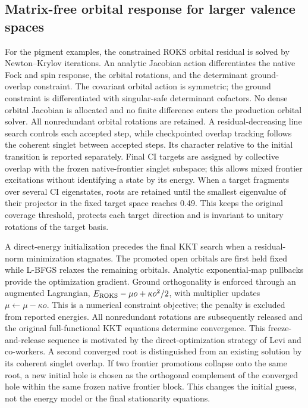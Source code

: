 \subsection{Matrix-free orbital response for larger valence spaces}
For the pigment examples, the constrained ROKS orbital residual is solved
by Newton--Krylov iterations. An analytic Jacobian action differentiates the
native Fock and spin response, the orbital rotations, and the determinant
ground-overlap constraint. The covariant orbital action is symmetric; the
ground constraint is differentiated with singular-safe determinant
cofactors. No dense orbital Jacobian is allocated and no finite difference
enters the production orbital solver. All nonredundant orbital rotations
are retained. A residual-decreasing line search controls each accepted
step, while checkpointed overlap tracking follows the coherent singlet
between accepted steps. Its character relative to the initial transition
is reported separately. Final CI targets are assigned by collective
overlap with the frozen native-frontier singlet subspace; this allows
mixed frontier excitations without identifying a state by its energy.
When a target fragments over several CI eigenstates, roots are retained
until the smallest eigenvalue of their projector in the fixed target space
reaches 0.49. This keeps the original coverage threshold, protects each
target direction and is invariant to unitary rotations of the target basis.

A direct-energy initialization precedes the final KKT search when a
residual-norm minimization stagnates. The promoted open orbitals are
first held fixed while L-BFGS relaxes the remaining orbitals. Analytic
exponential-map pullbacks provide the optimization gradient. Ground
orthogonality is enforced through an augmented Lagrangian,
$E_{\rm ROKS}-\mu o+\kappa o^2/2$, with multiplier updates
$\mu\leftarrow\mu-\kappa o$. This is a numerical constraint objective;
the penalty is excluded from reported energies. All nonredundant
rotations are subsequently released and the original full-functional
KKT equations determine convergence. This freeze-and-release sequence
is motivated by the direct-optimization strategy of Levi and
co-workers.\cite{freeze2026} A second converged root is distinguished
from an existing solution by its coherent singlet overlap. If two
frontier promotions collapse onto the same root, a new initial hole
is chosen as the orthogonal complement of the converged hole within
the same frozen native frontier block. This changes the initial guess,
not the energy model or the final stationarity equations.

